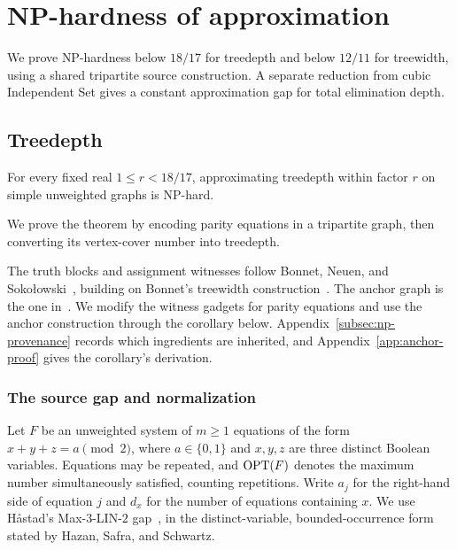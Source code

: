 \section{\textup{NP}-hardness of approximation}
\label{sec:np-hardness}

We prove \textup{NP}-hardness below $18/17$ for treedepth and below $12/11$
for treewidth, using a shared tripartite source construction. A
separate reduction from cubic Independent Set gives a constant
approximation gap for total elimination depth.

\subsection{Treedepth}
\label{subsec:np-treedepth}

\begin{theorem}\label{thm:np-hardness}
For every fixed real $1\le r<18/17$, approximating treedepth within
factor $r$ on simple unweighted graphs is \textup{NP}-hard.
\end{theorem}

We prove the theorem by encoding parity equations in a tripartite
graph, then converting its vertex-cover number into treedepth.

The truth blocks and assignment witnesses follow Bonnet, Neuen, and
Soko\l owski~\cite[Section~4 and Lemma~10]{BNS}, building on Bonnet's
treewidth construction~\cite[Section~3.1]{BonnetTreewidth}. The anchor graph
is the one in~\cite[Lemma~6]{BNS}. We modify the witness gadgets
for parity equations and use the anchor construction through the
corollary below. Appendix~\ref{subsec:np-provenance} records which
ingredients are inherited, and Appendix~\ref{app:anchor-proof} gives
the corollary's derivation.

\subsubsection{The source gap and normalization}

Let $F$ be an unweighted system of $m\ge1$ equations of the form
$x+y+z=a\pmod2$, where $a\in\{0,1\}$ and $x,y,z$ are three distinct
Boolean variables. Equations may be
repeated, and $\operatorname{OPT}(F)$ denotes the maximum number simultaneously
satisfied, counting repetitions. Write $a_j$ for the right-hand side
of equation $j$ and $d_x$ for the number of
equations containing $x$. We use H{\aa}stad's Max-3-LIN-$2$
gap~\cite{Hastad1997}, in the distinct-variable,
bounded-occurrence form stated by Hazan, Safra, and Schwartz.

